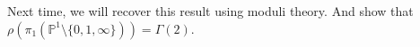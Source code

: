 \documentclass[11pt]{article}
\theoremstyle{definition}
\newcommand\PP{{\mathbb{P}}}
\begin{document}
Next time, we will recover this result using moduli theory. And show that $\rho (\pi_1(\PP^1 \setminus \{0,1,\infty\})) =\Gamma(2)$. 


\end{document}
